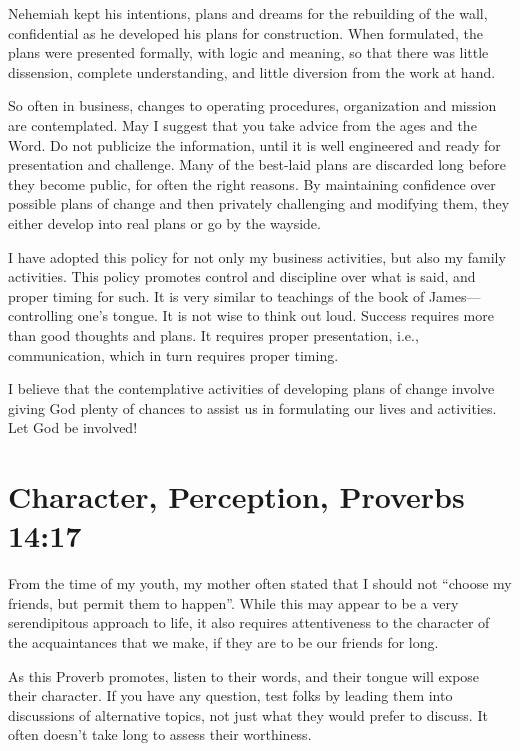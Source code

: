 \documentclass[12pt]{memoir}
\begin{document}
Nehemiah kept his intentions, plans and dreams for the rebuilding
of the wall, confidential as he developed his plans for construction.
When formulated, the plans were presented formally, with logic and
meaning, so that there was little dissension, complete understanding,
and little diversion from the work at hand.

So often in business, changes to operating procedures, organization
and mission are contemplated. May I suggest that you take advice from
the ages and the Word. Do not publicize the information, until it
is well engineered and ready for presentation and challenge. Many
of the best-laid plans are discarded long before they become public,
for often the right reasons. By maintaining confidence over possible
plans of change and then privately challenging and modifying them,
they either develop into real plans or go by the wayside.

I have adopted this policy for not only my business activities, but also my family activities.
This policy promotes control and discipline over what is said, and proper timing for such.
It is very similar to teachings of the book of James---controlling one's
tongue.
It is not wise to think out loud.
Success requires more than good thoughts and plans.
It requires proper presentation, i.e., communication, which in turn requires proper timing.

I believe that the contemplative activities of developing plans of change involve giving God plenty of chances to assist us in formulating our lives and activities. Let God be involved!

\section[Character, Perception]{Character, Perception, Proverbs 14:17}

From the time of my youth, my mother often stated that I should not ``choose my friends, but permit them to happen''. While this may
appear to be a very serendipitous approach to life, it also requires attentiveness to the character of the acquaintances that we make,
if they are to be our friends for long.

As this Proverb promotes, listen to their words, and their tongue will expose their character.
If you have any question, test folks by leading them into discussions of  alternative topics, not just what they would prefer to discuss. It often doesn't take long to assess their worthiness.
\end{document}
